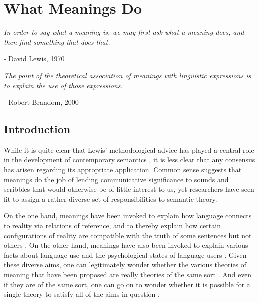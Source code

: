 
\chapter{What Meanings Do}
\renewcommand{\epigraphrule}{0pt}
\setlength{\epigraphwidth}{4.5in}
\epigraph{\textit{In order to say what a meaning is, we may first ask what a meaning does, and then find something that does that.}}{- David Lewis, 1970}

\setlength{\epigraphwidth}{4.5in}
\epigraph{\textit{The point of the theoretical association of meanings with linguistic expressions is to explain the use of those expressions.}}{- Robert Brandom, 2000}

\section{Introduction}

While it is quite clear that Lewis' methodological advice has played a central role in the development of contemporary semantics \citep{LiangPotts:2015}, it is less clear that any consensus has arisen regarding its appropriate application. Common sense suggests that meanings do the job of lending communicative significance to sounds and scribbles that would otherwise be of little interest to us, yet researchers have seen fit to assign a rather diverse set of responsibilities to semantic theory. 

On the one hand, meanings have been invoked to explain how language connects to reality via relations of reference, and to thereby explain how certain configurations of reality are compatible with the truth of some sentences but not others \citep{Speaks:2014,Lewis:1970,Soames:2010}. On the other hand, meanings have also been invoked to explain various facts about language use \citep{Wittgenstein:1953,Brandom:1994,Brandom:2000,Horwich:2005,Horwich:1998} and the psychological states of language users \citep{Block:1986,Harman:1982}. Given these diverse aims, one can legitimately wonder whether the various theories of meaning that have been proposed are really theories of the same sort \citep{Block:1986}. And even if they are of the same sort, one can go on to wonder whether it is possible for a single theory to satisfy all of the aims in question \citep{Horwich:1998}. 

